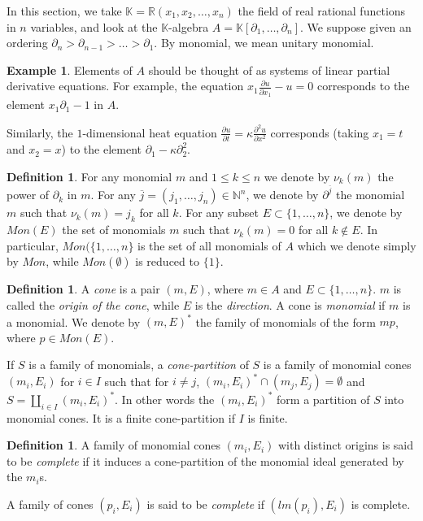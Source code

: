 \documentclass[10pt]{easychair}
\theoremstyle{definition}
\newtheorem{definition}[theorem]{Definition}
\newtheorem{example}[theorem]{Example}
\newcommand\K{\mathbb{K}}
\begin{document}
In this section, we take $\K = \mathbb R(x_1,x_2,\ldots,x_n)$ the field of real rational functions in $n$ variables, and look at the $\K$-algebra $A = \K[\partial_1,\ldots,\partial_n]$. We suppose given an ordering $\partial_n > \partial_{n-1} > \ldots > \partial_1$. By monomial, we mean unitary monomial.

\begin{example}
  Elements of $A$ should be thought of as systems of linear partial derivative equations. For example, the equation $x_1 \frac{\partial u}{\partial x_1} - u = 0$ corresponds to the element $x_1 \partial_1 - 1$ in $A$.

  Similarly, the $1$-dimensional heat equation $\frac{\partial u}{\partial t} = \kappa \frac{\partial^2 u}{\partial x^2}$  corresponds (taking $x_1 = t$ and $x_2 = x$) to the element $\partial_1 - \kappa \partial_2^2$.
\end{example}

\begin{definition}
 For any monomial $m$ and $1 \leq k \leq n$ we denote by $\nu_k(m)$ the power of $\partial_k$ in $m$.
For any $\overline j =(j_1,\ldots,j_n) \in \mathbb N^n$, we denote by $\partial^{\overline j}$ the monomial $m$ such that $\nu_k(m) = j_k$ for all $k$. For any subset $E \subset \{1,\ldots,n\}$, we denote by $Mon(E)$ the set of monomials $m$ such that $\nu_k(m) = 0$ for all $k \notin E$. In particular, $Mon(\{1,\ldots,n\}$ is the set of all monomials of $A$ which we denote simply by $Mon$, while $Mon(\emptyset)$ is reduced to $\{1\}$. 
\end{definition}

\begin{definition}
  A \emph{cone} is a pair $(m,E)$, where $m \in A$ and $E \subset \{1,\ldots,n\}$. $m$ is called the \emph{origin of the cone}, while $E$ is the \emph{direction}. A cone is \emph{monomial} if $m$ is a monomial. We denote by $(m,E)^*$ the family of monomials of the form $mp$, where $p \in Mon(E)$.

  If $S$ is a family of monomials, a \emph{cone-partition} of $S$ is a family of monomial cones $(m_i,E_i)$ for $i \in I$ such that for $i \neq j$, $(m_i,E_i)^* \cap (m_j,E_j) = \emptyset$ and $S = \coprod_{i \in I} (m_i,E_i)^*$. In other words the $(m_i,E_i)^*$ form a partition of $S$ into monomial cones. It is a finite cone-partition if $I$ is finite.
\end{definition}


 \begin{definition}
   A family of monomial cones $(m_i,E_i)$ with distinct origins is said to be \emph{complete} if it induces a cone-partition of the monomial ideal generated by the $m_i$s. 

   A family of cones $(p_i,E_i)$ is said to be \emph{complete} if $(lm(p_i),E_i)$ is complete. 
 \end{definition}
\end{document}
